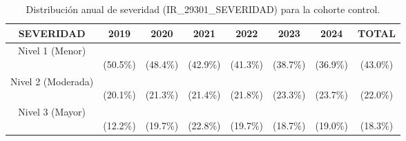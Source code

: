 \begin{table}[htbp]
\centering
\scriptsize
\setlength{\tabcolsep}{4pt}
\renewcommand{\arraystretch}{1.4}
\caption{Distribución anual de severidad (IR\_29301\_SEVERIDAD) para la cohorte control.}
\label{tab:frecuencia_severidad_control}
\begin{tabular}{|c|c|c|c|c|c|c|c|}
\hline
\parbox[t]{4.0cm}{\centering\textbf{SEVERIDAD}} & 
\parbox[t]{1.2cm}{\centering\textbf{2019}} & 
\parbox[t]{1.2cm}{\centering\textbf{2020}} & 
\parbox[t]{1.2cm}{\centering\textbf{2021}} & 
\parbox[t]{1.2cm}{\centering\textbf{2022}} & 
\parbox[t]{1.2cm}{\centering\textbf{2023}} & 
\parbox[t]{1.2cm}{\centering\textbf{2024}} & 
\parbox[t]{1.6cm}{\centering\textbf{TOTAL}} \\ \hline
\parbox[t]{4.0cm}{\raggedright Nivel 1 (Menor)} & \parbox[t]{1.2cm}{\\(50.5\%)} & \parbox[t]{1.2cm}{\\(48.4\%)} & \parbox[t]{1.2cm}{\\(42.9\%)} & \parbox[t]{1.2cm}{\\(41.3\%)} & \parbox[t]{1.2cm}{\\(38.7\%)} & \parbox[t]{1.2cm}{\\(36.9\%)} & \parbox[t]{1.6cm}{\\(43.0\%)} \\ \hline
\parbox[t]{4.0cm}{\raggedright Nivel 2 (Moderada)} & \parbox[t]{1.2cm}{\\(20.1\%)} & \parbox[t]{1.2cm}{\\(21.3\%)} & \parbox[t]{1.2cm}{\\(21.4\%)} & \parbox[t]{1.2cm}{\\(21.8\%)} & \parbox[t]{1.2cm}{\\(23.3\%)} & \parbox[t]{1.2cm}{\\(23.7\%)} & \parbox[t]{1.6cm}{\\(22.0\%)} \\ \hline
\parbox[t]{4.0cm}{\raggedright Nivel 3 (Mayor)} & \parbox[t]{1.2cm}{\\(12.2\%)} & \parbox[t]{1.2cm}{\\(19.7\%)} & \parbox[t]{1.2cm}{\\(22.8\%)} & \parbox[t]{1.2cm}{\\(19.7\%)} & \parbox[t]{1.2cm}{\\(18.7\%)} & \parbox[t]{1.2cm}{\\(19.0\%)} & \parbox[t]{1.6cm}{\\(18.3\%)} \\ \hline

\end{tabular}
\end{table}
